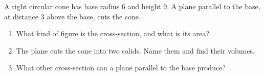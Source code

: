 A right circular cone has base radius $6$ and height $9$. A plane parallel to the base, at distance $3$ above the base, cuts the cone.
\begin{enumerate}
\item[(a)] What kind of figure is the cross-section, and what is its area?
\item[(b)] The plane cuts the cone into two solids. Name them and find their volumes.
\item[(c)] What other cross-section can a plane parallel to the base produce?
\end{enumerate}
